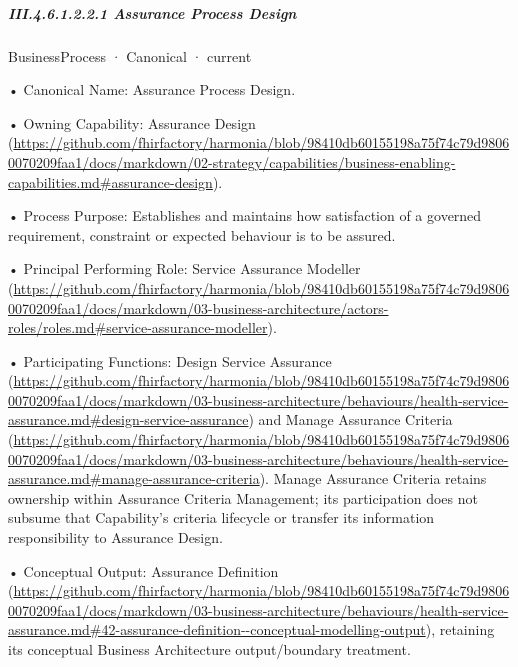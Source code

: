 \subparagraph*{III.4.6.1.2.2.1 Assurance Process Design}
\label{navigation:III.4.6.1.2.2.1}

\label{element:aec3177dcdd84961814f2ba4f688ad33}
{\small BusinessProcess · Canonical · current}\par

•
Canonical Name: Assurance Process Design.



•
Owning Capability: Assurance Design (\url{https://github.com/fhirfactory/harmonia/blob/98410db60155198a75f74c79d98060070209faa1/docs/markdown/02-strategy/capabilities/business-enabling-capabilities.md#assurance-design}).



•
Process Purpose: Establishes and maintains how satisfaction of a governed requirement, constraint or expected behaviour is to be assured.



•
Principal Performing Role: Service Assurance Modeller (\url{https://github.com/fhirfactory/harmonia/blob/98410db60155198a75f74c79d98060070209faa1/docs/markdown/03-business-architecture/actors-roles/roles.md#service-assurance-modeller}).



•
Participating Functions: Design Service Assurance (\url{https://github.com/fhirfactory/harmonia/blob/98410db60155198a75f74c79d98060070209faa1/docs/markdown/03-business-architecture/behaviours/health-service-assurance.md#design-service-assurance}) and Manage Assurance Criteria (\url{https://github.com/fhirfactory/harmonia/blob/98410db60155198a75f74c79d98060070209faa1/docs/markdown/03-business-architecture/behaviours/health-service-assurance.md#manage-assurance-criteria}). Manage Assurance Criteria retains ownership within Assurance Criteria Management; its participation does not subsume that Capability's criteria lifecycle or transfer its information responsibility to Assurance Design.



•
Conceptual Output: Assurance Definition (\url{https://github.com/fhirfactory/harmonia/blob/98410db60155198a75f74c79d98060070209faa1/docs/markdown/03-business-architecture/behaviours/health-service-assurance.md#42-assurance-definition--conceptual-modelling-output}), retaining its conceptual Business Architecture output/boundary treatment.



